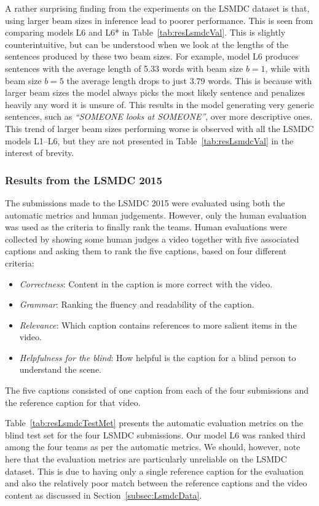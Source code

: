 A rather surprising finding from the experiments on the LSMDC dataset is that,
using larger beam sizes in inference lead to poorer performance.
This is seen from comparing models L6 and L6* in Table~\ref{tab:resLsmdcVal}.
This is slightly counterintuitive, but can be understood when we look at the
lengths of the sentences produced by these two beam sizes. 
For example, model L6 produces sentences with the average length of 5.33 words
with beam size $b=1$, while with beam size $b=5$ the average length drops to
just 3.79 words. 
This is because with larger beam sizes the model always picks the most likely
sentence and penalizes heavily any word it is unsure of.
This results in the model generating very generic sentences, such as
\emph{``SOMEONE looks at SOMEONE''}, over more descriptive ones.
This trend of larger beam sizes performing worse is observed with all the LSMDC
models L1--L6, but they are not presented in Table~\ref{tab:resLsmdcVal} in the
interest of brevity.

\subsubsection{Results from the LSMDC 2015}
\label{subsec:LSMDCChall}
The submissions made to the LSMDC 2015 were evaluated using both the automatic
metrics and human judgements.
However, only the human evaluation was used as the criteria to finally rank the teams.
Human evaluations were collected by showing some human judges a video together
with five associated captions and asking them to rank the five captions, based
on four different criteria:
\begin{itemize}
  \item \emph{Correctness}: Content in the caption is more correct with the video. 
  \item \emph{Grammar}: Ranking the fluency and readability of the caption. 
  \item \emph{Relevance}: Which caption contains references to more salient items in the video.
  \item \emph{Helpfulness for the blind}: How helpful is the caption for a
          blind person to understand the scene.
\end{itemize}
The five captions consisted of one caption from each of the four submissions and
the reference caption for that video.

Table~\ref{tab:resLsmdcTestMet} presents the automatic evaluation metrics on the
blind test set for the four LSMDC submissions.
Our model L6 was ranked third among the four teams as per the automatic metrics.
We should, however, note here that the evaluation metrics are particularly unreliable
on the LSMDC dataset.
This is due to having only a single reference caption for the evaluation and also
the relatively poor match between the reference captions and the video content
as discussed in Section~\ref{subsec:LsmdcData}.

